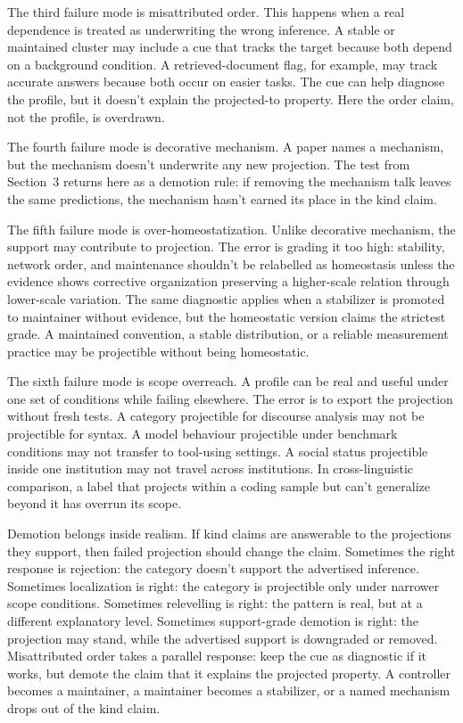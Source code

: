 \documentclass[12pt]{article}
\begin{document}
The third failure mode is misattributed order. This happens when a real
dependence is treated as underwriting the wrong inference. A stable or maintained
cluster may include a cue that tracks the target because both depend on a
background condition. A retrieved-document flag, for example, may track accurate
answers because both occur on easier tasks. The cue can help diagnose the
profile, but it doesn't explain the projected-to property. Here the order claim,
not the profile, is overdrawn.

The fourth failure mode is decorative mechanism. A paper names a mechanism, but
the mechanism doesn't underwrite any new projection. The test from Section~3
returns here as a demotion rule: if removing the mechanism talk leaves the same
predictions, the mechanism hasn't earned its place in the kind claim.

The fifth failure mode is over-homeostatization. Unlike decorative mechanism, the
support may contribute to projection. The error is grading it too high:
stability, network order, and maintenance shouldn't be relabelled as homeostasis
unless the evidence shows corrective organization preserving a higher-scale
relation through lower-scale variation. The same diagnostic applies when a
stabilizer is promoted to maintainer without evidence, but the homeostatic
version claims the strictest grade. A maintained convention, a stable
distribution, or a reliable measurement practice may be projectible without
being homeostatic.

The sixth failure mode is scope overreach. A profile can be real and useful
under one set of conditions while failing elsewhere. The error is to export the
projection without fresh tests. A category projectible for discourse analysis
may not be projectible for syntax. A model behaviour projectible under benchmark
conditions may not transfer to tool-using settings. A social status projectible
inside one institution may not travel across institutions. In cross-linguistic
comparison, a label that projects within a coding sample but can't generalize
beyond it has overrun its scope.

Demotion belongs inside realism. If kind claims are
answerable to the projections they support, then failed projection should change
the claim. Sometimes the right response is rejection: the category doesn't
support the advertised inference. Sometimes localization is right: the category
is projectible only under narrower scope conditions. Sometimes relevelling is
right: the pattern is real, but at a different explanatory level. Sometimes
support-grade demotion is right: the projection may stand, while the advertised
support is downgraded or removed. Misattributed order takes a parallel response:
keep the cue as diagnostic if it works, but demote the claim that it explains
the projected property. A controller becomes a maintainer, a maintainer becomes a
stabilizer, or a named mechanism drops out of the kind claim.
\end{document}

